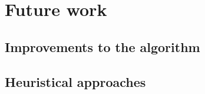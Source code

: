 \documentclass[thesis.tex]{subfiles}
\begin{document}
\chapter{Future work}
\section{Improvements to the algorithm}
\section{Heuristical approaches}
\label{sec:heuristical_approaches}
\end{document}
